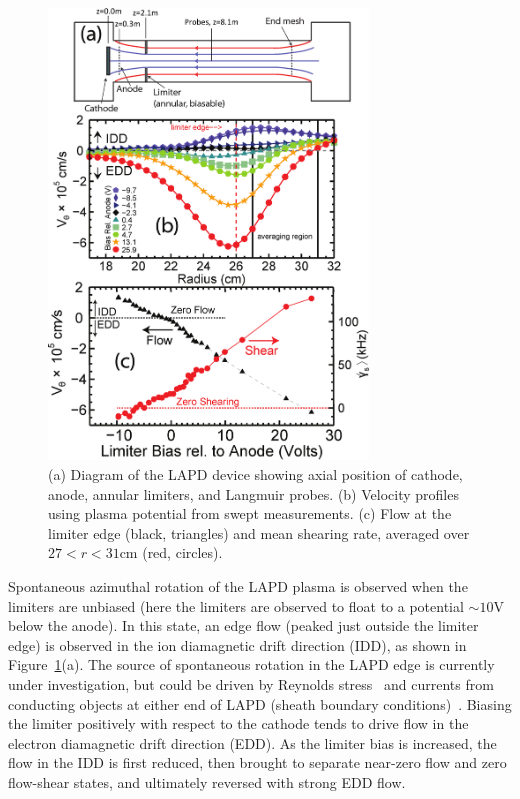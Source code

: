 \documentclass[aps,prl,amsmath,amssymb,preprint,superscriptaddress]{revtex4} %
\begin{document}
\begin{figure}[!htbp]
\centerline{
\includegraphics[width=8.5cm]{figure1.eps}}
\caption{\label{fig:velocity_flowshear} (a) Diagram of the LAPD device showing axial position of cathode, anode, annular limiters, and Langmuir probes. (b) Velocity profiles using plasma potential from swept measurements. (c) Flow at the limiter edge (black, triangles) and mean shearing rate, averaged over $27 < r < 31$cm (red, circles).}
\end{figure}

Spontaneous azimuthal rotation of the LAPD plasma is observed when the limiters are
unbiased (here the limiters are observed to float to a
potential $\sim 10$V below the anode).  In this state, an edge flow
(peaked just outside the limiter edge) is
observed in the ion diamagnetic drift direction (IDD), as shown in
Figure~\ref{fig:velocity_flowshear}(a).  The source of spontaneous rotation in the LAPD edge is currently under investigation, but could be driven by Reynolds stress~\cite{holland06} and currents from conducting objects at either end of LAPD (sheath boundary conditions)~\cite{rogers10}.
Biasing the limiter positively
with respect to the cathode tends to drive flow in the electron
diamagnetic drift direction (EDD).  As the limiter bias is increased, the
flow in the IDD is first reduced, then brought to separate near-zero flow
and zero flow-shear states, and ultimately reversed with strong EDD flow.
\end{document}
